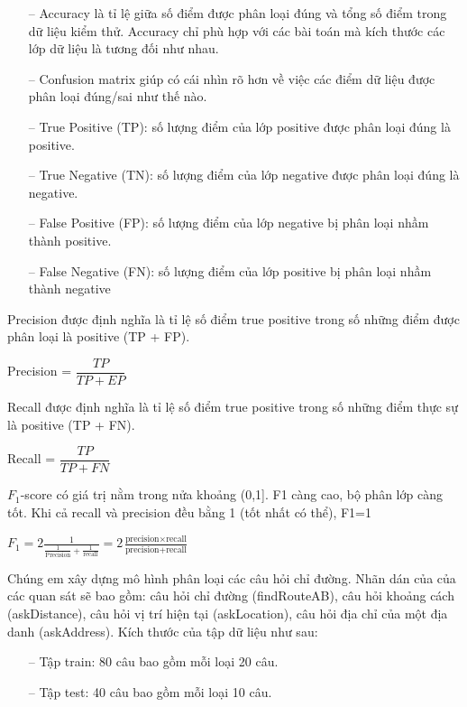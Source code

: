 \begin{itemize}
    \item[--] Accuracy là tỉ lệ giữa số điểm được phân loại đúng và tổng số điểm trong dữ liệu kiểm thử. Accuracy chỉ phù hợp với các bài toán mà kích thước các lớp dữ liệu là tương đối như nhau.
    \item[--] Confusion matrix giúp có cái nhìn rõ hơn về việc các điểm dữ liệu được phân loại đúng/sai như thế nào.
    \item[--] True Positive (TP): số lượng điểm của lớp positive được phân loại đúng là positive.
    \item[--] True Negative (TN): số lượng điểm của lớp negative được phân loại đúng là negative.
    \item[--] False Positive (FP): số lượng điểm của lớp negative bị phân loại nhầm thành positive.
    \item[--] False Negative (FN): số lượng điểm của lớp positive bị phân loại nhầm thành negative
\end{itemize}

Precision được định nghĩa là tỉ lệ số điểm true positive trong số những điểm được phân loại là positive (TP + FP).
\begin{center}
    Precision = $\dfrac{TP}{TP+EP}$
\end{center}

Recall được định nghĩa là tỉ lệ số điểm true positive trong số những điểm thực sự là positive (TP + FN).
\begin{center}
    Recall = $\dfrac{TP}{TP+FN}$
\end{center}

$F_{1}$-score có giá trị nằm trong nửa khoảng (0,1]. F1 càng cao, bộ phân lớp càng tốt. Khi cả recall và precision đều bằng 1 (tốt nhất có thể), F1=1
\begin{center}
    $F_{1}=2\frac{1}{\frac{1}{\text{Precision}} + \frac{1}{\text{recall}}}= 2\frac{\text{precision} \times \text{recall}}{\text{precision} + \text{recall}}$
\end{center}

Chúng em xây dựng mô hình phân loại các câu hỏi chỉ đường. Nhãn dán của của các quan sát sẽ bao gồm: câu hỏi chỉ đường (findRouteAB), câu hỏi khoảng cách (askDistance), câu hỏi vị trí hiện tại (askLocation), câu hỏi địa chỉ của một địa danh (askAddress). Kích thước của tập dữ liệu như sau:
\begin{itemize}
    \item[--] Tập train: 80 câu bao gồm mỗi loại 20 câu.
    \item[--] Tập test: 40 câu bao gồm mỗi loại 10 câu.
\end{itemize}

